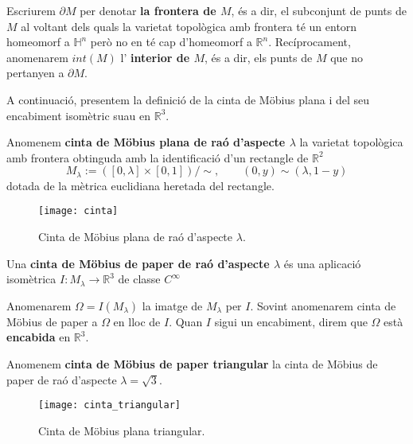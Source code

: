 \begin{nota}\label{nota:frontier_and_interior}
    Escriurem $\partial M$ per denotar \textbf{la frontera de $M$}, és a dir, el subconjunt de punts de $M$ al voltant dels quals la varietat topològica amb frontera té un entorn homeomorf a $\mathbb H^n$ però no en té cap d'homeomorf a $\mathbb R^n$. Recíprocament, anomenarem $int(M)$ l' \textbf{interior de $M$}, és a dir, els punts de $M$ que no pertanyen a $\partial M$.
\end{nota}

A continuació, presentem la definició de la cinta de Möbius plana i del seu encabiment isomètric suau en $\mathbb R^3$.
\begin{defi}
    Anomenem \textbf{cinta de Möbius plana de raó d'aspecte $\lambda$} la varietat topològica amb frontera obtinguda amb la identificació d'un rectangle de $\mathbb R^2$
    $$M_\lambda := ([0,\lambda] \times [0,1])/\sim, \quad\quad (0,y)\sim(\lambda,1-y)$$
    dotada de la mètrica euclidiana heretada del rectangle.
\end{defi}

\begin{figure}[htbp]
    \centering
    \texttt{[image: cinta]}
    \caption{Cinta de Möbius plana de raó d'aspecte $\lambda$.}
    \label{fig:mobius_plana}
\end{figure}


\begin{defi}\label{def:cinta_mobius_paper}
    Una \textbf{cinta de Möbius de paper de raó d'aspecte $\lambda$} és una aplicació isomètrica $I:M_{\lambda}\to\mathbb R^3$ de classe $C^\infty$
\end{defi}
\begin{nota}
    Anomenarem $\Omega=I(M_\lambda)$ la imatge de $M_\lambda$ per $I$. Sovint anomenarem cinta de Möbius de paper a $\Omega$ en lloc de $I$. Quan $I$ sigui un encabiment, direm que $\Omega$ està \textbf{encabida} en $\mathbb R^3$.
\end{nota}

\begin{ex}
    Anomenem \textbf{cinta de Möbius de paper triangular} la cinta de Möbius de paper de raó d'aspecte $\lambda = \sqrt{3}$.
\end{ex}
\begin{figure}[htbp]
    \centering
    \texttt{[image: cinta\_triangular]}
    \caption{Cinta de Möbius plana triangular.}
    \label{fig:mobius_triangular}
\end{figure}




